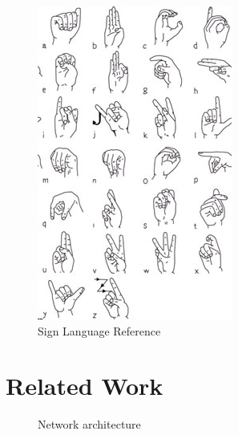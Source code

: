\documentclass[10pt,twocolumn,letterpaper]{article}
\begin{document}
\begin{figure}[t]
\begin{center}
 \includegraphics[width=0.8\linewidth]{imgs/NIDCD-ASL-hands-2014.jpg}
\end{center}
\caption{Sign Language Reference}
\label{fig:long}
\end{figure}


\blindtext



\section{Related Work}

\begin{figure}[ht]
\begin{center}
\fbox{\rule{0pt}{2in} \rule{.9\linewidth}{0pt}}
\end{center}
   \caption{Network architecture}
\label{fig:arch}
\end{figure}
\end{document}
